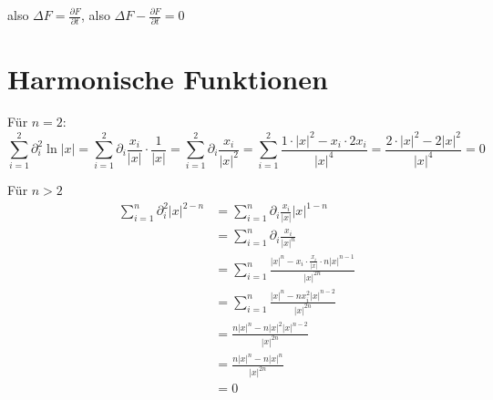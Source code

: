 \documentclass[sectionformat=aufgabe]{gadsescript}
\begin{document}
also $ \Delta F = \frac{ \partial F }{ \partial t }  $, also $ \Delta F - \frac{ \partial F }{ \partial t } = 0 $

\section{Harmonische Funktionen}
Für $ n = 2 $:
\[
	\sum_{i=1}^{2} \partial_i^2 \ln \left| x \right|
	= \sum_{i=1}^{2} \partial_i \frac{ x_i }{ \left| x \right|  } \cdot \frac{ 1 }{ \left| x \right|  }
	= \sum_{i=1}^{2} \partial_i \frac{x_i}{ \left| x \right| ^{2} }
	= \sum_{i=1}^{2} \frac{1 \cdot \left| x \right| ^2 - x_i \cdot 2 x_i }{ \left| x \right| ^{4} }
	= \frac{2 \cdot \left| x \right| ^2 - 2 \left| x \right| ^2}{ \left| x \right| ^{4} }
	= 0
\]

Für $ n > 2 $ 
\begin{align*}
	\sum_{i=1}^{n} \partial_i^2 \left| x \right| ^{2 - n}
	& = \sum_{i=1}^{n} \partial_i \frac{ x_i }{ \left| x \right|  } \left| x \right| ^{1 - n} \\
	& = \sum_{i=1}^{n} \partial_i \frac{ x_i }{ \left| x \right|^{n} } \\
	& = \sum_{i=1}^{n} \frac{ \left| x \right| ^n - x_i \cdot \frac{x_i}{ \left| x \right|  } \cdot n \left| x \right| ^{n - 1}  }{ \left| x \right|^{2n} } \\
	& = \sum_{i=1}^{n} \frac{ \left| x \right| ^n - n x_i^2 \left| x \right| ^{n - 2}  }{ \left| x \right|^{2n} } \\
	& = \frac{ n \left| x \right| ^n - n \left| x \right| ^2 \left| x \right| ^{n - 2}  }{ \left| x \right|^{2n} } \\
	& = \frac{ n \left| x \right| ^n - n \left| x \right| ^{n}  }{ \left| x \right|^{2n} } \\
	& = 0
\end{align*}
\end{document}
